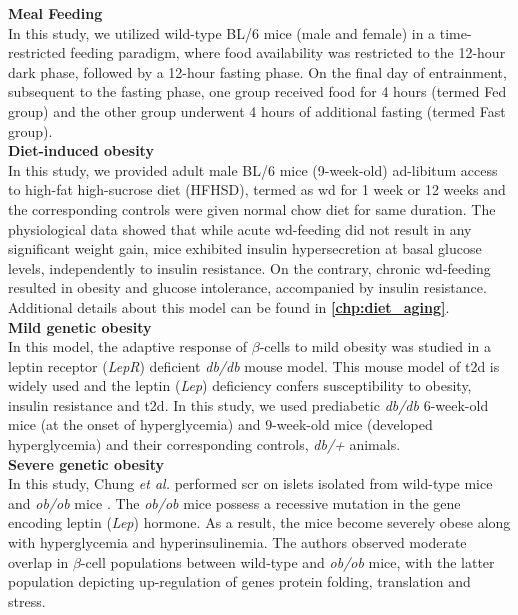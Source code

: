 \textbf{Meal Feeding\\}
In this study, we utilized wild-type BL/6 mice (male and female) in a time-restricted feeding paradigm, where food availability was restricted to the 12-hour dark phase, followed by a 12-hour fasting phase. On the final day of entrainment, subsequent to the fasting phase, one group received food for 4 hours (termed Fed group) and the other group underwent 4 hours of additional fasting (termed Fast group).\\

\textbf{Diet-induced obesity\\}
In this study, we provided adult male BL/6 mice (9-week-old) ad-libitum access to high-fat high-sucrose diet (HFHSD), termed as \acrfull{wd} for 1 week or 12 weeks and the corresponding controls were given normal chow diet for same duration. The physiological data showed that while acute \gls{wd}-feeding did not result in any significant weight gain, mice exhibited insulin hypersecretion at basal glucose levels, independently to insulin resistance. On the contrary, chronic \gls{wd}-feeding resulted in obesity and glucose intolerance, accompanied by insulin resistance. Additional details about this model can be found in \textbf{\autoref{chp:diet_aging}}.\\

\textbf{Mild genetic obesity\\}
In this model, the adaptive response of $\beta$-cells to mild obesity was studied in a leptin receptor (\textit{LepR}) deficient \textit{db/db} mouse model. This mouse model of \gls{t2d} is widely used and the leptin (\textit{Lep}) deficiency confers susceptibility to obesity, insulin resistance and \gls{t2d}. In this study, we used prediabetic \textit{db/db} 6-week-old mice (at the onset of hyperglycemia) and 9-week-old mice (developed hyperglycemia) and their corresponding controls, \textit{db/+} animals.\\

\textbf{Severe genetic obesity\\}
In this study, Chung \textit{et al.} performed \gls{scr} on islets isolated from wild-type mice and \textit{ob/ob} mice \textbf{\cite{chung_endocrine-exocrine_2020}}. The \textit{ob/ob} mice possess a recessive mutation in the gene encoding leptin (\textit{Lep}) hormone. As a result, the mice become severely obese along with hyperglycemia and hyperinsulinemia. The authors observed moderate overlap in $\beta$-cell populations between wild-type and \textit{ob/ob} mice, with the latter population depicting up-regulation of genes protein folding, translation and  stress.\\

